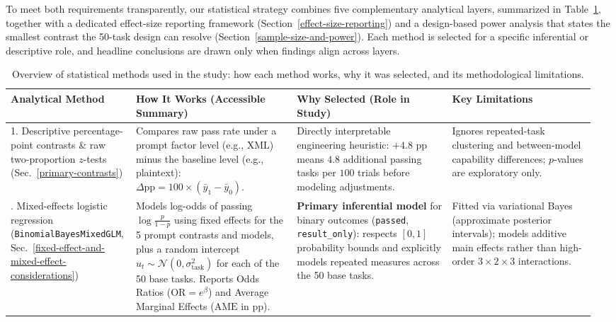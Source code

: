 \documentclass[a4paper,fleqn]{cas-sc}
\begin{document}
To meet both requirements transparently, our statistical strategy combines five complementary analytical layers, summarized in Table~\ref{tab:statistical-methods-overview}, together with a dedicated effect-size reporting framework (Section~\ref{effect-size-reporting}) and a design-based power analysis that states the smallest contrast the 50-task design can resolve (Section~\ref{sample-size-and-power}). Each method is selected for a specific inferential or descriptive role, and headline conclusions are drawn only when findings align across layers.

\begin{table}[htbp]
\centering
\caption{Overview of statistical methods used in the study: how each method works, why it was selected, and its methodological limitations.}\label{tab:statistical-methods-overview}
\footnotesize
\setlength{\tabcolsep}{4pt}
\begin{tabular}{@{}p{0.19\linewidth}p{0.27\linewidth}p{0.26\linewidth}p{0.24\linewidth}@{}}
\toprule
\textbf{Analytical Method} & \textbf{How It Works (Accessible Summary)} & \textbf{Why Selected (Role in Study)} & \textbf{Key Limitations} \\
\midrule
1. Descriptive percentage-point contrasts \& raw two-proportion $z$-tests (Sec.~\ref{primary-contrasts}) & Compares raw pass rate under a prompt factor level (e.g., XML) minus the baseline level (e.g., plaintext): $\Delta\text{pp} = 100 \times (\bar{y}_1 - \bar{y}_0)$. & Directly interpretable engineering heuristic: $+4.8\text{ pp}$ means $4.8$ additional passing tasks per $100$ trials before modeling adjustments. & Ignores repeated-task clustering and between-model capability differences; $p$-values are exploratory only. \\
\addlinespace[3pt]
2. Mixed-effects logistic regression (\texttt{BinomialBayesMixedGLM}, Sec.~\ref{fixed-effect-and-mixed-effect-considerations}) & Models log-odds of passing $\log\frac{p}{1-p}$ using fixed effects for the 5 prompt contrasts and models, plus a random intercept $u_t \sim \mathcal{N}(0, \sigma^2_{\text{task}})$ for each of the 50 base tasks. Reports Odds Ratios ($\text{OR} = e^{\beta}$) and Average Marginal Effects ($\text{AME}$ in pp). & \textbf{Primary inferential model} for binary outcomes (\texttt{passed}, \texttt{result\_only}): respects $[0, 1]$ probability bounds and explicitly models repeated measures across the 50 base tasks. & Fitted via variational Bayes (approximate posterior intervals); models additive main effects rather than high-order $3\times 2\times 3$ interactions. \\

\end{tabular}
\end{table}
\end{document}
